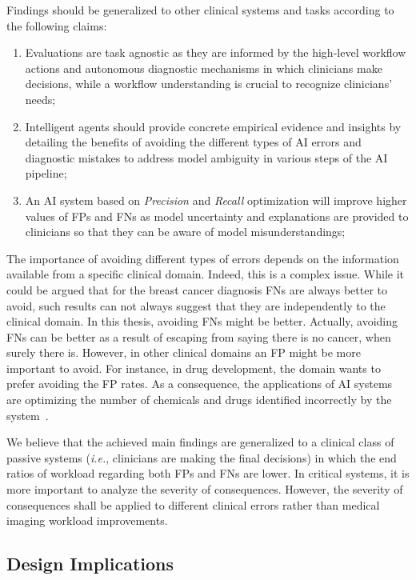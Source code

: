 \hfill

\noindent
Findings should be generalized to other clinical systems and tasks according to the following claims:

\begin{enumerate}
\item Evaluations are task agnostic as they are informed by the high-level workflow actions and autonomous diagnostic mechanisms in which clinicians make decisions, while a workflow understanding is crucial to recognize clinicians' needs;
\item Intelligent agents should provide concrete empirical evidence and insights by detailing the benefits of avoiding the different types of AI errors and diagnostic mistakes to address model ambiguity in various steps of the AI pipeline;
\item An AI system based on {\it Precision} and {\it Recall} optimization will improve higher values of FPs and FNs as model uncertainty and explanations are provided to clinicians so that they can be aware of model misunderstandings;
\end{enumerate}

The importance of avoiding different types of errors depends on the information available from a specific clinical domain.
Indeed, this is a complex issue.
While it could be argued that for the breast cancer diagnosis FNs are always better to avoid, such results can not always suggest that they are independently to the clinical domain.
In this thesis, avoiding FNs might be better.
Actually, avoiding FNs can be better as a result of escaping from saying there is no cancer, when surely there is.
However, in other clinical domains an FP might be more important to avoid.
For instance, in drug development, the domain wants to prefer avoiding the FP rates.
As a consequence, the applications of AI systems are optimizing the number of chemicals and drugs identified incorrectly by the system~\cite{raja2017machine}.

We believe that the achieved main findings are generalized to a clinical class of passive systems ({\it i.e.}, clinicians are making the final decisions) in which the end ratios of workload regarding both FPs and FNs are lower.
In critical systems, it is more important to analyze the severity of consequences.
However, the severity of consequences shall be applied to different clinical errors rather than medical imaging workload improvements.

\subsection{Design Implications}

